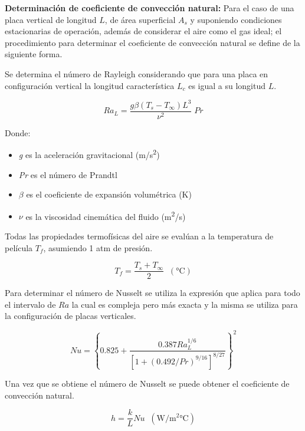 \textbf{Determinación de coeficiente de convección natural:} Para el caso de una placa vertical de longitud $L$, de área superficial $A_{s}$ y suponiendo condiciones estacionarias de operación, además de considerar el aire como el gas ideal; el procedimiento para determinar el coeficiente de convección natural se define de la siguiente forma. \cite{cengel}

Se determina el número de Rayleigh considerando que para una placa en configuración vertical la longitud característica $L_{c}$ es igual a su longitud $L$.

\begin{equation}\label{ra1}
   Ra_{L}=\frac{g\beta (T_{s}-T_{\infty })L^{3}}{\nu^{2} }\;Pr
\end{equation}

Donde:

\begin{itemize}
    \item \textit{g} es la aceleración gravitacional (\si{\meter/\square\second})
    \item \textit{Pr} es el número de Prandtl 
    \item $\beta$ es el coeficiente de expansión volumétrica (\si{\kelvin})
    \item $\nu$ es la viscosidad cinemática del fluido (\si{\square\meter/\second})
\end{itemize}

Todas las propiedades termofísicas del aire se evalúan a la temperatura de película $T_{f}$, asumiendo 1 atm de presión.

\begin{equation}\label{tf}
   T_{f} = \frac{T_{s}+T_{\infty }}{2}\;\;(\si{\celsius})
\end{equation}

Para determinar el número de Nusselt se utiliza la expresión que aplica para todo el intervalo de $Ra$ la cual es compleja pero más exacta y la misma se utiliza para la configuración de placas verticales.

\begin{equation}\label{nu1}
   Nu=\left \{ 0.825+\frac{0.387Ra_{L}^{1/6}}{\left[ 1+(0.492/Pr)^{9/16}\right] ^{8/27}}\right\}^{2} 
\end{equation}

Una vez que se obtiene el número de Nusselt se puede obtener el coeficiente de convección natural.

\begin{equation}\label{h1}
    h=\frac{k}{L}Nu\; \; (\si{\watt/\square\meter\celsius})
\end{equation}

